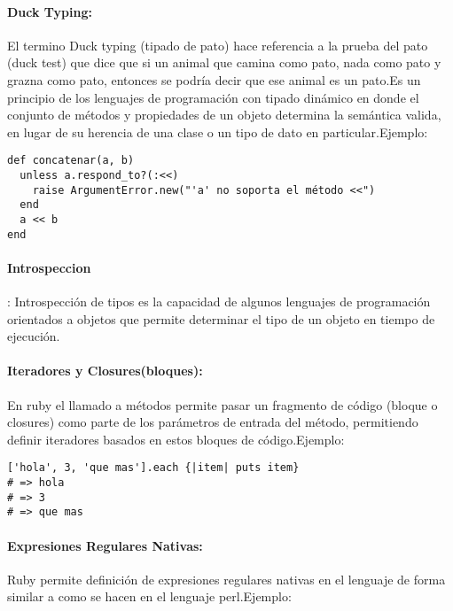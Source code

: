 \paragraph{Duck Typing:}
El termino Duck typing (tipado de pato) hace referencia a la prueba del pato (duck test) que dice que si un animal que camina como pato, nada como pato y grazna como pato, entonces se podría decir que ese animal es un pato.\newline Es un principio de los lenguajes de programación con tipado dinámico en donde el conjunto de métodos y propiedades de un objeto determina la semántica valida, en lugar de su herencia de una clase o un tipo de dato en particular.\newline Ejemplo:

\begin{verbatim}
def concatenar(a, b)
  unless a.respond_to?(:<<)
    raise ArgumentError.new("'a' no soporta el método <<")
  end
  a << b
end
\end{verbatim}

\paragraph{Introspeccion}:
Introspección de tipos es la capacidad de algunos lenguajes de programación orientados a objetos que permite determinar el tipo de un objeto en tiempo de ejecución.

\paragraph{Iteradores y Closures(bloques):}
En ruby el llamado a métodos permite pasar un fragmento de código (bloque o closures) como parte de los parámetros de entrada del método, permitiendo definir iteradores basados en estos bloques de código.\newline Ejemplo:

\begin{verbatim}
['hola', 3, 'que mas'].each {|item| puts item}
# => hola
# => 3
# => que mas
\end{verbatim}


\paragraph{Expresiones Regulares Nativas:}
Ruby permite definición de expresiones regulares nativas en el lenguaje de forma similar a como se hacen en el lenguaje perl.\newline Ejemplo:

